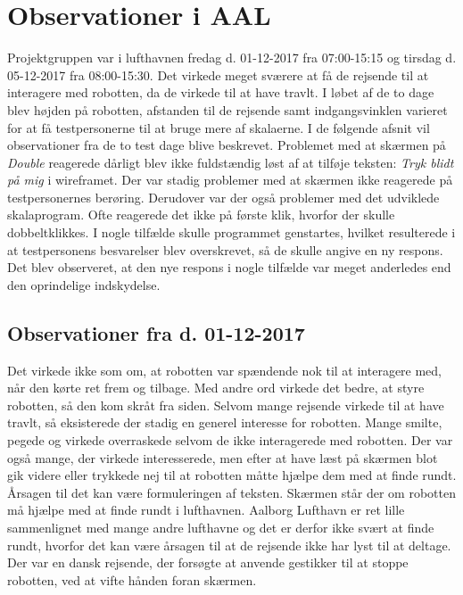 \section{Observationer i AAL}
\label{TestAfSkalaLufthavnsBesog}
%
Projektgruppen var i lufthavnen fredag d. 01-12-2017 fra 07:00-15:15 og tirsdag d. 05-12-2017 fra 08:00-15:30. Det virkede meget sværere at få de rejsende til at interagere med robotten, da de virkede til at have travlt. I løbet af de to dage blev højden på robotten, afstanden til de rejsende samt indgangsvinklen varieret for at få testpersonerne til at bruge mere af skalaerne. I de følgende afsnit vil observationer fra de to test dage blive beskrevet.\blankline
%
Problemet med at skærmen på \textit{Double} reagerede dårligt blev ikke fuldstændig løst af at tilføje teksten: \textit{Tryk blidt på mig} i wireframet. Der var stadig problemer med at skærmen ikke reagerede på testpersonernes berøring. Derudover var der også problemer med det udviklede skalaprogram. Ofte reagerede det ikke på første klik, hvorfor der skulle dobbeltklikkes. I nogle tilfælde skulle programmet genstartes, hvilket resulterede i at testpersonens besvarelser blev overskrevet, så de skulle angive en ny respons. Det blev observeret, at den nye respons i nogle tilfælde var meget anderledes end den oprindelige indskydelse.

\subsection{Observationer fra d. 01-12-2017}
Det virkede ikke som om, at robotten var spændende nok til at interagere med, når den kørte ret frem og tilbage. Med andre ord virkede det bedre, at styre robotten, så den kom skråt fra siden. Selvom mange rejsende virkede til at have travlt, så eksisterede der stadig en generel interesse for robotten. Mange smilte, pegede og virkede overraskede selvom de ikke interagerede med robotten. Der var også mange, der virkede interesserede, men efter at have læst på skærmen blot gik videre eller trykkede nej til at robotten måtte hjælpe dem med at finde rundt. Årsagen til det kan være formuleringen af teksten. Skærmen står der om robotten må hjælpe med at finde rundt i lufthavnen. Aalborg Lufthavn er ret lille sammenlignet med mange andre lufthavne og det er derfor ikke svært at finde rundt, hvorfor det kan være årsagen til at de rejsende ikke har lyst til at deltage. Der var en dansk rejsende, der forsøgte at anvende gestikker til at stoppe robotten, ved at vifte hånden foran skærmen.

